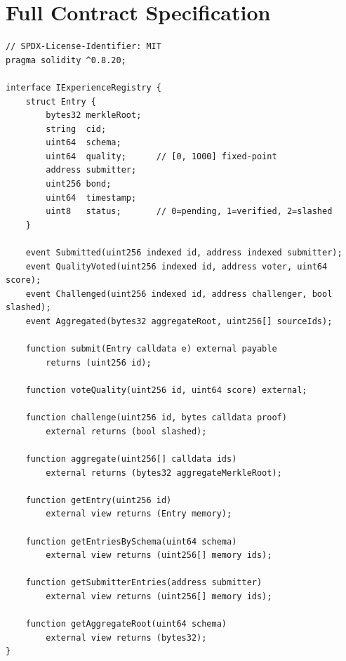 \section{Full Contract Specification}

\label{app:contract}

\begin{verbatim}
// SPDX-License-Identifier: MIT
pragma solidity ^0.8.20;

interface IExperienceRegistry {
    struct Entry {
        bytes32 merkleRoot;
        string  cid;
        uint64  schema;
        uint64  quality;      // [0, 1000] fixed-point
        address submitter;
        uint256 bond;
        uint64  timestamp;
        uint8   status;       // 0=pending, 1=verified, 2=slashed
    }

    event Submitted(uint256 indexed id, address indexed submitter);
    event QualityVoted(uint256 indexed id, address voter, uint64 score);
    event Challenged(uint256 indexed id, address challenger, bool slashed);
    event Aggregated(bytes32 aggregateRoot, uint256[] sourceIds);

    function submit(Entry calldata e) external payable
        returns (uint256 id);

    function voteQuality(uint256 id, uint64 score) external;

    function challenge(uint256 id, bytes calldata proof)
        external returns (bool slashed);

    function aggregate(uint256[] calldata ids)
        external returns (bytes32 aggregateMerkleRoot);

    function getEntry(uint256 id)
        external view returns (Entry memory);

    function getEntriesBySchema(uint64 schema)
        external view returns (uint256[] memory ids);

    function getSubmitterEntries(address submitter)
        external view returns (uint256[] memory ids);

    function getAggregateRoot(uint64 schema)
        external view returns (bytes32);
}
\end{verbatim}


